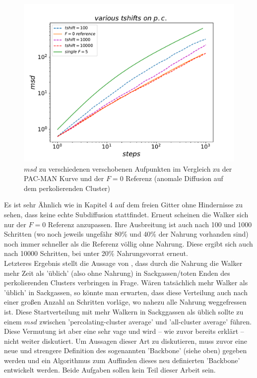 \documentclass[a4paper, 12pt]{report}
\begin{document}
\begin{figure}[H]
	\centering
	\includegraphics[scale=0.6]{tshift_pc.pdf}
	\caption{$msd$ zu verschiedenen verschobenen Aufpunkten im Vergleich zu der PAC-MAN Kurve und der $F=0$ Referenz (anomale Diffusion auf dem perkolierenden Cluster)}
\end{figure}

\clearpage

\noindent Es ist sehr Ähnlich wie in Kapitel 4 auf dem freien Gitter ohne Hindernisse zu sehen, dass keine echte Subdiffusion stattfindet. Erneut scheinen die Walker sich nur der $F=0$ Referenz anzupassen. Ihre Ausbreitung ist auch nach 100 und 1000 Schritten (wo noch jeweils ungefähr 80\% und 40\% der Nahrung vorhanden sind) noch immer schneller als die Referenz völlig ohne Nahrung. Diese ergibt sich auch nach 10000 Schritten, bei unter 20\% Nahrungsvorrat erneut.
\\
Letzteres Ergebnis stellt die Aussage von \cite{doi:10.1063/1.4999485}, dass durch die Nahrung die Walker mehr Zeit als 'üblich' (also ohne Nahrung) in Sackgassen/toten Enden des perkolierenden Clusters verbringen in Frage. Wären tatsächlich mehr Walker als 'üblich' in Sackgassen, so könnte man erwarten, dass diese Verteilung auch nach einer großen Anzahl an Schritten vorläge, wo nahezu alle Nahrung weggefressen ist. Diese Startverteilung mit mehr Walkern in Sackggassen als üblich sollte zu einem $msd$ zwischen 'percolating-cluster average' und 'all-cluster average' führen. Diese Vermutung ist aber eine sehr vage und wird -- wie zuvor bereits erklärt -- nicht weiter diskutiert. Um Aussagen dieser Art zu diskutieren, muss zuvor eine neue und strengere Definition des sogenannten 'Backbone' (siehe oben) gegeben werden und ein Algorithmus zum Auffinden dieses neu definierten 'Backbone' entwickelt werden. Beide Aufgaben sollen kein Teil dieser Arbeit sein.
\end{document}

